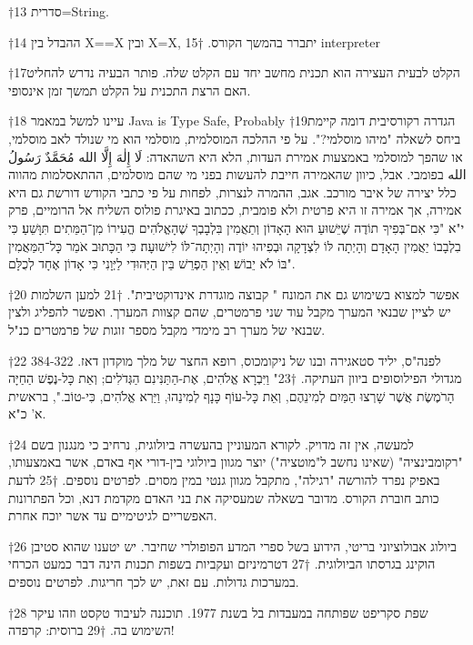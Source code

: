 \begin{טבלא}[!htbp]
†{13} סדרית=String.

†{14} ההבדל בין X==X ובין X=X, יתברר בהמשך הקורס.
†{15} interpreter

†{17}הקלט לבעית העצירה הוא תכנית מחשב יחד עם הקלט שלה. פותר הבעיה נדרש להחליט האם הרצת התכנית על הקלט תמשך זמן אינסופי.

†{18} עיינו למשל במאמר Java is Type Safe, Probably
†{19}הגדרה רקורסיבית דומה קיימת ביחס לשאלה "מיהו מוסלמי?". על פי ההלכה המוסלמית, מוסלמי הוא מי שנולד לאב מוסלמי, או שהפך למוסלמי באמצעות אמירת העדות, הלא היא השהאדה: لَا إِلٰهَ إِلَّا الله مُحَمَّدٌ رَسُولُ الله בפומבי. אבל, כיוון שהאמירה חייבת להעשות בפני מי שהם מוסלמים, ההתאסלמות מהווה כלל יצירה של איבר מורכב. אגב, ההמרה לנצרות, לפחות על פי כתבי הקודש דורשת גם היא אמירה, אך אמירה זו היא פרטית ולא פומבית, ככתוב באיגרת פולוס השליח אל הרומיים, פרק י"א "כִּי אִם־בְּפִיךָ תוֹדֶה שֶׁיֵּשׁוּעַ הוּא הָאָדוֹן וְתַאֲמִין בִּלְבָבְךָ שֶׁהָאֱלֹהִים הֱעִירוֹ מִן־הַמֵּתִים תִּוָּשֵׁעַ׃ כִּי בִלְבָבוֹ יַאֲמִין הָאָדָם וְהָיְתָה לּוֹ לִצְדָקָה וּבְפִיהוּ יוֹדֶה וְהָיְתָה־לּוֹ לִישׁוּעָה׃ כִּי הַכָּתוּב אֹמֵר כָּל־הַמַּאֲמִין בּוֹ לֹא יֵבוֹשׁ׃ וְאֵין הַפְרֵשׁ בֵּין הַיְּהוּדִי לַיְּוָנִי כִּי אָדוֹן אֶחָד לְכֻלָּם".

†{20} אפשר למצוא בשימוש גם את המונח " קבוצה מוגדרת אינדוקטיבית".
†{21} למען השלמות יש לציין שבנאי המערך מקבל עוד שני פרמטרים, שהם קצוות המערך. ואפשר להפליג ולצין שבנאי של מערך רב מימדי מקבל מספר זוגות של פרמטרים כנ"ל.

†{22} 384-322 לפנה"ס, יליד סטאגירה ובנו של ניקומכוס, רופא החצר של מלך מוקדון דאז. מגדולי הפילוסופים ביוון העתיקה.
†{23}" וַיִּבְרָא אֱלֹהִים, אֶת-הַתַּנִּינִם הַגְּדֹלִים; וְאֵת כָּל-נֶפֶשׁ הַחַיָּה הָרֹמֶשֶׂת אֲשֶׁר שָׁרְצוּ הַמַּיִם לְמִינֵהֶם, וְאֵת כָּל-עוֹף כָּנָף לְמִינֵהוּ, וַיַּרְא אֱלֹהִים, כִּי-טוֹב.", בראשית א' כ"א.

†{24} למעשה, אין זה מדויק. לקורא המעוניין בהעשרה ביולוגית, נרחיב כי מנגנון בשם "רקומבינציה" (שאינו נחשב ל"מוטציה") יוצר מגוון ביולוגי בין-דורי אף באדם, אשר באמצעותו, באפיק נפרד להורשה "רגילה", מתקבל מגוון גנטי במין מסוים. לפרטים נוספים.
†{25} לדעת כותב חוברת הקורס. מדובר בשאלה שמעסיקה את בני האדם מקדמת דנא, וכל הפתרונות האפשריים לגיטימיים עד אשר יוכח אחרת.

†{26} ביולוג אבולוציוני בריטי, הידוע בשל ספרי המדע הפופולרי שחיבר. יש יטענו שהוא סטיבן הוקינג בגרסתו הביולוגית.
†{27} דטרמיניזם ועקביות בשפות תכנות הינה דבר כמעט הכרחי במערכות גדולות. עם זאת, יש לכך חריגות. לפרטים נוספים.

†{28} שפת סקריפט שפותחה במעבדות בל בשנת 1977. תוכננה לעיבוד טקסט וזהו עיקר השימוש בה.
†{29} ברוסית: קרפדה!


\end{טבלא}
